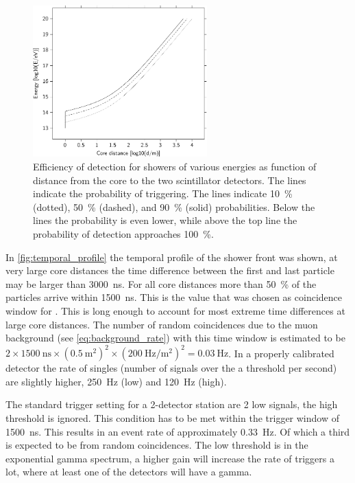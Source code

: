 \begin{figure}
    \centering
    \includegraphics[width=0.6\textwidth]
                    {plots/station/efficiency_distance_energy}
    \caption{Efficiency of detection for showers of various energies as function of distance from the core to the two scintillator detectors. The lines indicate the probability of triggering. The lines indicate \SI{10}{\percent} (dotted), \SI{50}{\percent} (dashed), and \SI{90}{\percent} (solid) probabilities. Below the lines the probability is even lower, while above the top line the probability of detection approaches \SI{100}{\percent}.}
    \label{fig:efficiency_distance_energy}
\end{figure}

In \cref{fig:temporal_profile} the temporal profile of the shower front was shown, at very large core distances the time difference between the first and last particle may be larger than \SI{3000}{\ns}. For all core distances more than \SI{50}{\percent} of the particles arrive within \SI{1500}{\ns}. This is the value that was chosen as coincidence window for \hisparc. This is long enough to account for most extreme time differences at large core distances. The number of random coincidences due to the muon background (see \cref{eq:background_rate}) with this time window is estimated to be $2 \times \SI{1500}{\ns} \times \left(\SI{0.5}{\meter\squared}\right)^2 \times \left(\SI{200}{\hertz\per\meter\squared}\right)^2 = \SI{0.03}{\hertz}$. In a properly calibrated detector the rate of singles (number of signals over the a threshold per second) are slightly higher, \SI{250}{\hertz} (low) and \SI{120}{\hertz} (high).

The standard trigger setting for a 2-detector station are 2 low signals, the high threshold is ignored. This condition has to be met within the trigger window of \SI{1500}{\ns}. This results in an event rate of approximately \SI{0.33}{\hertz}. Of which a third is expected to be from random coincidences. The low threshold is in the exponential gamma spectrum, a higher \pmt gain will increase the rate of triggers a lot, where at least one of the detectors will have a gamma.

